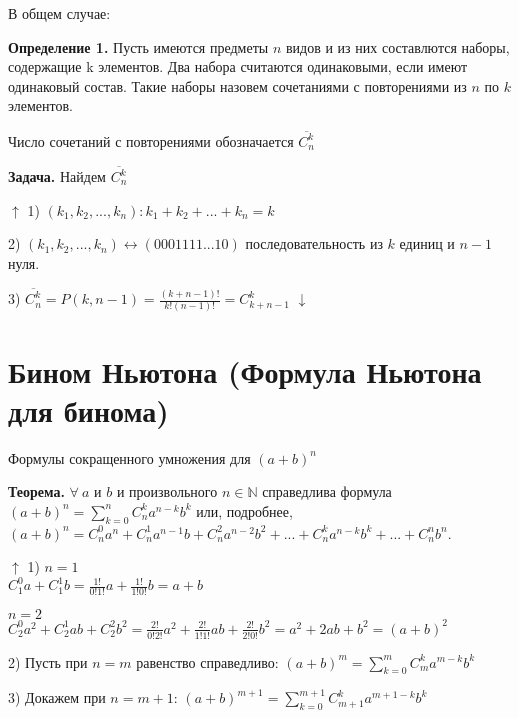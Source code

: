 \documentclass{article}
\begin{document}
    В общем случае:

    \textbf{Определение 1.} Пусть имеются предметы \(n\) видов и из них составлются наборы, содержащие k элементов. 
    Два набора считаются одинаковыми, если имеют одинаковый состав. 
    Такие наборы назовем сочетаниями с повторениями из \(n\) по \(k\) элементов.

    Число сочетаний с повторениями обозначается \(\overline{C_n^k}\)

    \textbf{Задача.} Найдем \(\overline{C_n^k}\)

    \(\uparrow\) 1) \((k_1, k_2, ..., k_n): k_1 + k_2 + ... + k_n = k\)

    2) \((k_1, k_2, ..., k_n) \leftrightarrow (0001111...10)\) последовательность из \(k\) единиц и \(n-1\) нуля.

    3) \(\overline{C_n^k} = P(k, n-1) = \frac{(k+n-1)!}{k!(n-1)!} = C_{k+n-1}^k\) \(\downarrow\)
    

    \section{Бином Ньютона (Формула Ньютона для бинома)}

    Формулы сокращенного умножения для \((a + b)^n\)

    \textbf{Теорема.} \(\forall\ a\) и \(b\) и произвольного \(n \in \mathbb{N}\) справедлива формула \((a + b)^n = \sum\limits_{k=0}^n C_n^k a^{n-k} b^k\) или, подробнее, \((a + b)^n = C_n^0 a^n + C_n^1 a^{n-1} b + C_n^2 a^{n-2} b^2 + ... + C_n^{k} a^{n-k} b^k + ... + C_n^n b^n\).

    \(\uparrow\) 1) \(n = 1\) 
    \\\(C_1^0 a + C_1^1 b = \frac{1!}{0!1!} a + \frac{1!}{1!0!} b = a + b\)

    \(n = 2\)
    \\\(C_2^0 a^2 + C_2^1 ab + C_2^2 b^2 = \frac{2!}{0!2!} a^2 + \frac{2!}{1!1!} ab + \frac{2!}{2!0!} b^2 = a^2 + 2ab + b^2 = (a + b)^2\)

    2) Пусть при \(n = m\) равенство справедливо: \((a + b)^m = \sum\limits_{k=0}^m C_m^k a^{m-k} b^k\)

    3) Докажем при \(n = m + 1\): \((a + b)^{m+1} = \sum\limits_{k=0}^{m+1} C_{m+1}^k a^{m+1-k} b^k\)
\end{document}
